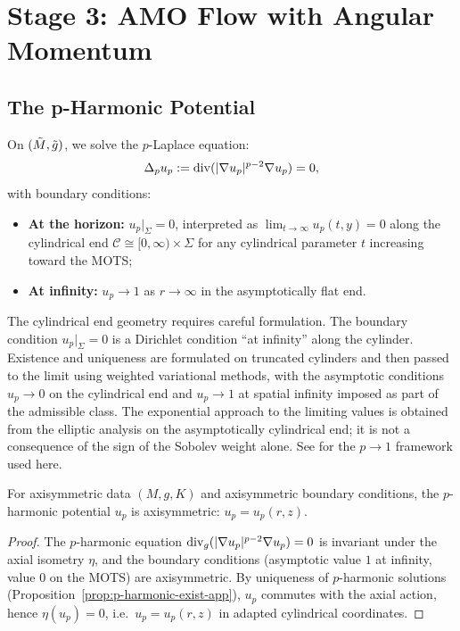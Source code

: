 \section{Stage 3: AMO Flow with Angular Momentum}\label{sec:amo}

\subsection{The p-Harmonic Potential}

On $(\tilde{M}, \tilde{g})$, we solve the $p$-Laplace equation:
\begin{equation}
\Delta_p u_p := \mathrm{div}(|\nabla u_p|^{p-2} \nabla u_p) = 0,
\end{equation}
with boundary conditions:
\begin{itemize}
    \item \textbf{At the horizon:} $u_p|_\Sigma = 0$, interpreted as $\lim_{t \to \infty} u_p(t, y) = 0$ along the cylindrical end $\mathcal{C} \cong [0, \infty) \times \Sigma$ for any cylindrical parameter $t$ increasing toward the MOTS;
    \item \textbf{At infinity:} $u_p \to 1$ as $r \to \infty$ in the asymptotically flat end.
\end{itemize}

\begin{remark}
The cylindrical end geometry requires careful formulation. The boundary condition $u_p|_\Sigma = 0$ is a Dirichlet condition ``at infinity'' along the cylinder. Existence and uniqueness are formulated on truncated cylinders and then passed to the limit using weighted variational methods, with the asymptotic conditions $u_p \to 0$ on the cylindrical end and $u_p \to 1$ at spatial infinity imposed as part of the admissible class. The exponential approach to the limiting values is obtained from the elliptic analysis on the asymptotically cylindrical end; it is not a consequence of the sign of the Sobolev weight alone. See \cite[Section 4]{amo2022} for the $p \to 1$ framework used here.
\end{remark}

\begin{lemma}\label{lem:axisymmetric-solution}
For axisymmetric data $(M, g, K)$ and axisymmetric boundary conditions, the $p$-harmonic potential $u_p$ is axisymmetric: $u_p = u_p(r, z)$.
\end{lemma}
\begin{proof}
The $p$-harmonic equation $\mathrm{div}_g(|\nabla u_p|^{p-2}\nabla u_p)=0$ is invariant under the axial isometry $\eta$, and the boundary conditions (asymptotic value $1$ at infinity, value $0$ on the MOTS) are axisymmetric. By uniqueness of $p$-harmonic solutions (Proposition~\ref{prop:p-harmonic-exist-app}), $u_p$ commutes with the axial action, hence $\eta(u_p)=0$, i.e.\ $u_p=u_p(r,z)$ in adapted cylindrical coordinates.
\end{proof}

